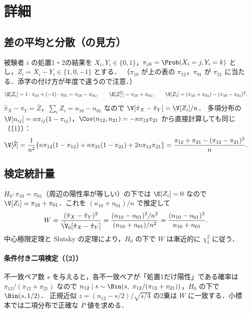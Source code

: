 \section{詳細}\label{sec:m06-shosai}
\subsection{差の平均と分散（の見方）}
被験者 $i$ の処置1・2の結果を $X_i,Y_i\in\{0,1\}$，$\pi_{jk}=\Prob(X_i=j,Y_i=k)$ とし，$Z_i=X_i-Y_i\in\{1,0,-1\}$ とする．
（$\pi_{10}$ が上の表の $\pi_{12}$，$\pi_{01}$ が $\pi_{21}$ に当たる．添字の付け方が年度で違うので注意．）
\[
\E[Z_i]=1\cdot\pi_{10}+(-1)\cdot\pi_{01}=\pi_{10}-\pi_{01},\qquad
\E[Z_i^2]=\pi_{10}+\pi_{01},\qquad
\V[Z_i]=(\pi_{10}+\pi_{01})-(\pi_{10}-\pi_{01})^2 .
\]
$\hat\pi_X-\hat\pi_Y=\bar Z$，$\sum_iZ_i=n_{10}-n_{01}$ なので $\V[\hat\pi_X-\hat\pi_Y]=\V[Z_i]/n$．
多項分布の $\V[n_{ij}]=n\pi_{ij}(1-\pi_{ij})$，$\Cov(n_{12},n_{21})=-n\pi_{12}\pi_{21}$ から直接計算しても同じ（〔1〕）：
\[
\V[\hat\delta]=\frac1{n^2}\{n\pi_{12}(1-\pi_{12})+n\pi_{21}(1-\pi_{21})+2n\pi_{12}\pi_{21}\}=\frac{\pi_{12}+\pi_{21}-(\pi_{12}-\pi_{21})^2}{n}.
\]

\subsection{検定統計量}
$H_0:\pi_{10}=\pi_{01}$（周辺の陽性率が等しい）の下では $\E[Z_i]=0$ なので $\V[Z_i]=\pi_{10}+\pi_{01}$．これを $(n_{10}+n_{01})/n$ で推定して
\[
W=\frac{(\hat\pi_X-\hat\pi_Y)^2}{\hat\V_0[\hat\pi_X-\hat\pi_Y]}=\frac{(n_{10}-n_{01})^2/n^2}{(n_{10}+n_{01})/n^2}=\frac{(n_{10}-n_{01})^2}{n_{10}+n_{01}} .
\]
中心極限定理と Slutsky の定理により，$H_0$ の下で $W$ は漸近的に $\chi^2_1$ に従う．
\paragraph{条件付き二項検定（〔2〕）}
不一致ペア数 $s$ を与えると，各不一致ペアが「処置1だけ陽性」である確率は $\pi_{12}/(\pi_{12}+\pi_{21})$ なので
$n_{12}\mid s\sim\Bin(s,\ \pi_{12}/(\pi_{12}+\pi_{21}))$，$H_0$ の下で $\Bin(s,1/2)$．
正規近似 $z=(n_{12}-s/2)/\sqrt{s/4}$ の2乗は $W$ に一致する．小標本では二項分布で正確な $P$ 値を求める．

